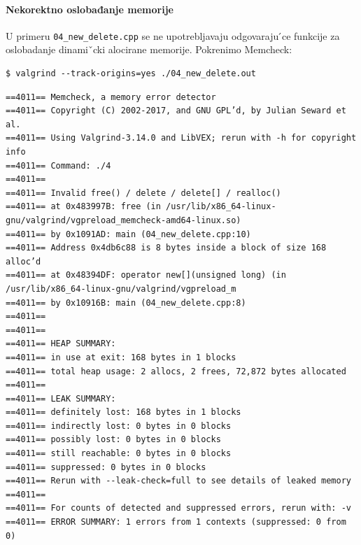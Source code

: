 \paragraph{Nekorektno oslobađanje memorije}\label{nekorektno-oslobaux111anje-memorije}

U primeru \texttt{04\_new\_delete.cpp} se ne upotrebljavaju odgovaraju ́ce funkcije za oslobadanje dinamiˇcki alocirane memorije. Pokrenimo Memcheck:

\begin{verbatim}
$ valgrind --track-origins=yes ./04_new_delete.out
\end{verbatim}

\begin{verbatim}
==4011== Memcheck, a memory error detector
==4011== Copyright (C) 2002-2017, and GNU GPL’d, by Julian Seward et al.
==4011== Using Valgrind-3.14.0 and LibVEX; rerun with -h for copyright info
==4011== Command: ./4
==4011==
==4011== Invalid free() / delete / delete[] / realloc()
==4011== at 0x483997B: free (in /usr/lib/x86_64-linux-gnu/valgrind/vgpreload_memcheck-amd64-linux.so)
==4011== by 0x1091AD: main (04_new_delete.cpp:10)
==4011== Address 0x4db6c88 is 8 bytes inside a block of size 168 alloc’d
==4011== at 0x48394DF: operator new[](unsigned long) (in /usr/lib/x86_64-linux-gnu/valgrind/vgpreload_m
==4011== by 0x10916B: main (04_new_delete.cpp:8)
==4011==
==4011==
==4011== HEAP SUMMARY:
==4011== in use at exit: 168 bytes in 1 blocks
==4011== total heap usage: 2 allocs, 2 frees, 72,872 bytes allocated
==4011==
==4011== LEAK SUMMARY:
==4011== definitely lost: 168 bytes in 1 blocks
==4011== indirectly lost: 0 bytes in 0 blocks
==4011== possibly lost: 0 bytes in 0 blocks
==4011== still reachable: 0 bytes in 0 blocks
==4011== suppressed: 0 bytes in 0 blocks
==4011== Rerun with --leak-check=full to see details of leaked memory
==4011==
==4011== For counts of detected and suppressed errors, rerun with: -v
==4011== ERROR SUMMARY: 1 errors from 1 contexts (suppressed: 0 from 0)
\end{verbatim}

